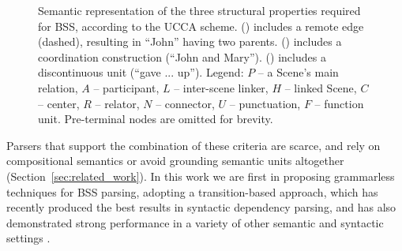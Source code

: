 \documentclass[11pt,letterpaper]{article}
\newcommand{\secref}[1]{Section~\ref{#1}}
\begin{document}
\begin{figure}[t]
\begin{subfigure}[t]{.9\columnwidth}
{{
  }}
  \end{subfigure}
  \begin{subfigure}[t]{.9\columnwidth}
  \parbox{.1\columnwidth}{\caption{}\label{fig:gave}}
  \hspace{.25\columnwidth}
  \parbox{.55\columnwidth}{
  }
  \end{subfigure}
  \caption{\label{fig:examples}
    Semantic representation of the three structural properties
    required for BSS, according to the UCCA scheme. () includes a remote edge (dashed),
    resulting in ``John'' having two parents. %
    () includes a coordination construction (``John and Mary'').
    () includes a discontinuous unit (``gave ... up'').
    Legend: $P$ -- a Scene's main relation, $A$ -- participant,
    $L$ -- inter-scene linker, $H$ -- linked Scene, $C$ -- center,
    $R$ -- relator, $N$ -- connector, $U$ -- punctuation, $F$ -- function unit.
    Pre-terminal nodes are omitted for brevity.
  }
\end{figure}

Parsers that support the combination of these criteria are scarce,
and rely on compositional semantics
or avoid grounding semantic units altogether (\secref{sec:related_work}).
In this work we are first in proposing grammarless techniques for BSS parsing,
adopting a transition-based approach, which has recently produced the best
results in syntactic dependency parsing, and has also demonstrated
strong performance in a variety of other semantic and syntactic settings
\cite[among others]{maier2015discontinuous,wang2015transition}.
\end{document}
